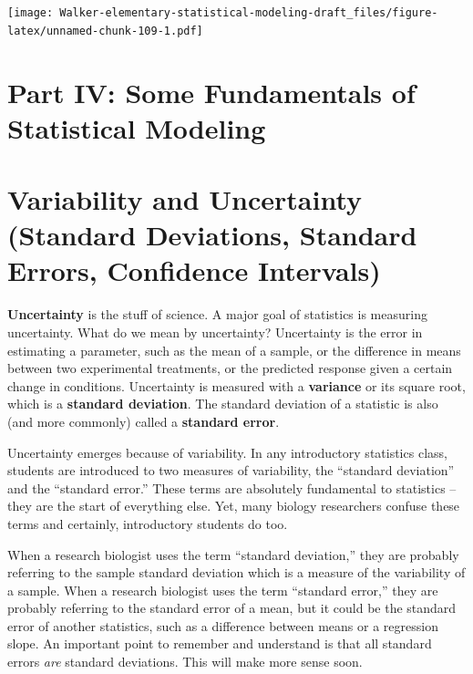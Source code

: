\documentclass[]{book}
\begin{document}
\texttt{[image: Walker-elementary-statistical-modeling-draft\_files/figure-latex/unnamed-chunk-109-1.pdf]}

\hypertarget{part-iv-some-fundamentals-of-statistical-modeling}{%
\chapter*{Part IV: Some Fundamentals of Statistical Modeling}\label{part-iv-some-fundamentals-of-statistical-modeling}}

\hypertarget{variability-and-uncertainty-standard-deviations-standard-errors-confidence-intervals}{%
\chapter{Variability and Uncertainty (Standard Deviations, Standard Errors, Confidence Intervals)}\label{variability-and-uncertainty-standard-deviations-standard-errors-confidence-intervals}}

\textbf{Uncertainty} is the stuff of science. A major goal of statistics is measuring uncertainty. What do we mean by uncertainty? Uncertainty is the error in estimating a parameter, such as the mean of a sample, or the difference in means between two experimental treatments, or the predicted response given a certain change in conditions. Uncertainty is measured with a \textbf{variance} or its square root, which is a \textbf{standard deviation}. The standard deviation of a statistic is also (and more commonly) called a \textbf{standard error}.

Uncertainty emerges because of variability. In any introductory statistics class, students are introduced to two measures of variability, the ``standard deviation'' and the ``standard error.'' These terms are absolutely fundamental to statistics -- they are the start of everything else. Yet, many biology researchers confuse these terms and certainly, introductory students do too.

When a research biologist uses the term ``standard deviation,'' they are probably referring to the sample standard deviation which is a measure of the variability of a sample. When a research biologist uses the term ``standard error,'' they are probably referring to the standard error of a mean, but it could be the standard error of another statistics, such as a difference between means or a regression slope. An important point to remember and understand is that all standard errors \emph{are} standard deviations. This will make more sense soon.
\end{document}
